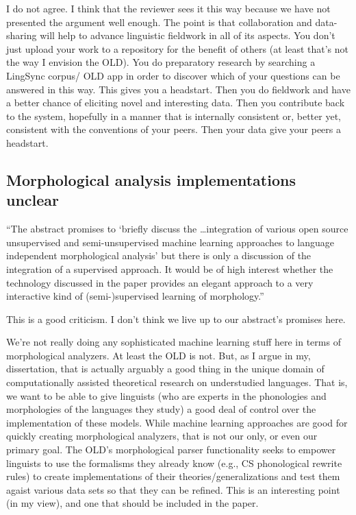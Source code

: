 \documentclass[11pt]{article}
\begin{document}
I do not agree. I think that the reviewer sees it this way because we have not
presented the argument well enough. The point is that collaboration and
data-sharing will help to advance linguistic fieldwork in all of its aspects. 
You don't just upload your work to a repository for the benefit of others (at
least that's not the way I envision the OLD). You do preparatory research by
searching a LingSync corpus/ OLD app in order to discover which of your
questions can be answered in this way. This gives you a headstart. Then you do
fieldwork and have a better chance of eliciting novel and interesting data. 
Then you contribute back to the system, hopefully in a manner that is
internally consistent or, better yet, consistent with the conventions of your
peers. Then your data give your peers a headstart.


\subsection{Morphological analysis implementations unclear}

``The abstract promises to `briefly discuss the \ldots integration of various
open source unsupervised and semi-unsupervised machine learning approaches to
language independent morphological analysis' but there is only a discussion of
the integration of a supervised approach. It would be of high interest whether
the technology discussed in the paper provides an elegant approach to a
very interactive kind of (semi-)supervised learning of morphology.''

This is a good criticism. I don't think we live up to our abstract's promises
here.

We're not really doing any sophisticated machine learning stuff here in terms
of morphological analyzers. At least the OLD is not. But, as I argue in my,
dissertation, that is actually arguably a good thing in the unique domain of
computationally assisted theoretical research on understudied languages. That
is, we want to be able to give linguists (who are experts in the phonologies
and morphologies of the languages they study) a good deal of control over the
implementation of these models. While machine learning approaches are good for
quickly creating morphological analyzers, that is not our only, or even our
primary goal. The OLD's morphological parser functionality seeks to empower 
linguists to use the formalisms they already know (e.g., CS phonological
rewrite rules) to create implementations of their theories/generalizations and
test them agaist various data sets so that they can be refined. This is an
interesting point (in my view), and one that should be included in the paper.
\end{document}
